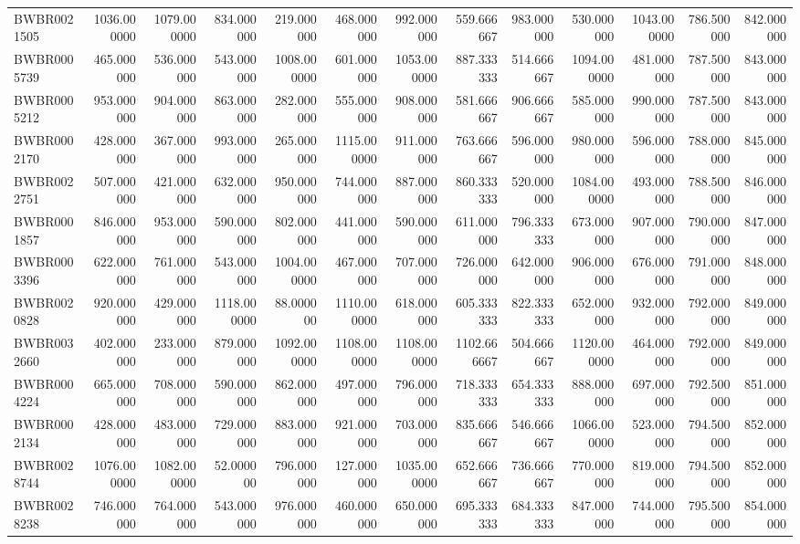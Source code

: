 \begin{longtable}{lrrrrrrrrrrrr}
BWBR0021505 & 1036.000000 & 1079.000000 & 834.000000 & 219.000000 & 468.000000 & 992.000000 & 559.666667 & 983.000000 & 530.000000 & 1043.000000 & 786.500000 & 842.000000 \\
BWBR0005739 & 465.000000 & 536.000000 & 543.000000 & 1008.000000 & 601.000000 & 1053.000000 & 887.333333 & 514.666667 & 1094.000000 & 481.000000 & 787.500000 & 843.000000 \\
BWBR0005212 & 953.000000 & 904.000000 & 863.000000 & 282.000000 & 555.000000 & 908.000000 & 581.666667 & 906.666667 & 585.000000 & 990.000000 & 787.500000 & 843.000000 \\
BWBR0002170 & 428.000000 & 367.000000 & 993.000000 & 265.000000 & 1115.000000 & 911.000000 & 763.666667 & 596.000000 & 980.000000 & 596.000000 & 788.000000 & 845.000000 \\
BWBR0022751 & 507.000000 & 421.000000 & 632.000000 & 950.000000 & 744.000000 & 887.000000 & 860.333333 & 520.000000 & 1084.000000 & 493.000000 & 788.500000 & 846.000000 \\
BWBR0001857 & 846.000000 & 953.000000 & 590.000000 & 802.000000 & 441.000000 & 590.000000 & 611.000000 & 796.333333 & 673.000000 & 907.000000 & 790.000000 & 847.000000 \\
BWBR0003396 & 622.000000 & 761.000000 & 543.000000 & 1004.000000 & 467.000000 & 707.000000 & 726.000000 & 642.000000 & 906.000000 & 676.000000 & 791.000000 & 848.000000 \\
BWBR0020828 & 920.000000 & 429.000000 & 1118.000000 & 88.000000 & 1110.000000 & 618.000000 & 605.333333 & 822.333333 & 652.000000 & 932.000000 & 792.000000 & 849.000000 \\
BWBR0032660 & 402.000000 & 233.000000 & 879.000000 & 1092.000000 & 1108.000000 & 1108.000000 & 1102.666667 & 504.666667 & 1120.000000 & 464.000000 & 792.000000 & 849.000000 \\
BWBR0004224 & 665.000000 & 708.000000 & 590.000000 & 862.000000 & 497.000000 & 796.000000 & 718.333333 & 654.333333 & 888.000000 & 697.000000 & 792.500000 & 851.000000 \\
BWBR0002134 & 428.000000 & 483.000000 & 729.000000 & 883.000000 & 921.000000 & 703.000000 & 835.666667 & 546.666667 & 1066.000000 & 523.000000 & 794.500000 & 852.000000 \\
BWBR0028744 & 1076.000000 & 1082.000000 & 52.000000 & 796.000000 & 127.000000 & 1035.000000 & 652.666667 & 736.666667 & 770.000000 & 819.000000 & 794.500000 & 852.000000 \\
BWBR0028238 & 746.000000 & 764.000000 & 543.000000 & 976.000000 & 460.000000 & 650.000000 & 695.333333 & 684.333333 & 847.000000 & 744.000000 & 795.500000 & 854.000000 \\

\end{longtable}
